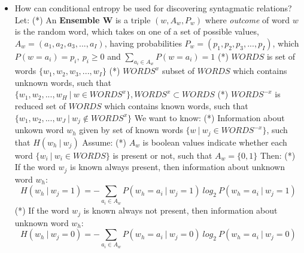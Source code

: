 \documentclass[11pt]{article}
\providecommand{\tightlist}{%
      \setlength{\itemsep}{0pt}\setlength{\parskip}{0pt}}
\begin{document}
    \begin{itemize}
\tightlist
\item
  How can conditional entropy be used for discovering syntagmatic
  relations? Let: (*) An \textbf{Ensemble W} is a triple
  \((w, A_w, P_w)\) where \emph{outcome} of word \(w\) is the random
  word, which takes on one of a set of possible values,
  \(A_w = (a_1, a_2, a_3, ..., a_I)\), having probabilities
  \(P_w = (p_1, p_2, p_3, ..., p_I)\), which
  \(P(w=a_i)=p_i, \ p_i \geq 0\) and \(\sum_{a_i \in A_w} P(w=a_i) = 1\)
  (*) \(WORDS\) is set of words \(\{w_1, w_2, w_3, ..., w_I\}\) (*)
  \(WORDS^x\) subset of \(WORDS\) which contains unknown words, such
  that
  \(\{w_1, w_2, ..., w_H \ | \ w \in WORDS^x \}, WORDS^x \subset WORDS\)
  (*) \(WORDS^{-x}\) is reduced set of \(WORDS\) which contains known
  words, such that \(\{w_1, w_2, ..., w_J \ | \ w_j \notin WORDS^x \}\)
  We want to know: (*) Information about unkown word \(w_h\) given by
  set of known words \(\{w \ | \ w_j \in WORDS^{-x}\}\), such that
  \(H(w_h \ | \ w_j)\) Assume: (*) \(A_w\) is boolean values indicate
  whether each word \(\{w_i \ | \ w_i \in WORDS\}\) is present or not,
  such that \(A_w = \{0, 1\}\) Then: (*) If the word \(w_j\) is known
  always present, then information about unknown word \(w_h\):
  \[H(w_h \ | \ w_j=1) = -\sum\limits_{a_i \in A_w} P(w_h = a_i \ | \ w_j = 1) \ log_2 \ P(w_h = a_i \ | \ w_j = 1)\]
  (*) If the word \(w_j\) is known always not present, then information
  about unknown word \(w_h\):
  \[H(w_h \ | \ w_j=0) = -\sum\limits_{a_i \in A_w} P(w_h = a_i \ | \ w_j = 0) \ log_2 \ P(w_h = a_i \ | \ w_j = 0)\]
\end{itemize}
\end{document}
